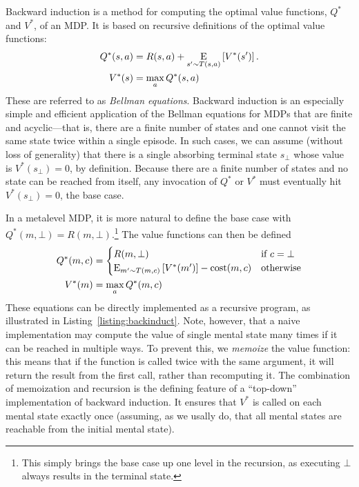 Backward induction is a method for computing the optimal value functions, $Q^*$ and $V^*$, of an MDP. It is based on recursive definitions of the optimal value functions:
\begin{equation}\label{eq:value-recursive}
\begin{aligned}
    Q^*(s, a) &= R(s, a) + \expectunder{V^*(s')}{s' \sim T(s,a)}.\\
    V^*(s) &= \max_a Q^*(s, a)
\end{aligned}
\end{equation}
These are referred to as \emph{Bellman equations}. Backward induction is an especially simple and efficient application of the Bellman equations for MDPs that are finite and acyclic---that is, there are a finite number of states and one cannot visit the same state twice within a single episode. In such cases, we can assume (without loss of generality) that there is a single absorbing terminal state $s_\bot$ whose value is $V^*(s_\bot) = 0$, by definition. Because there are a finite number of states and no state can be reached from itself, any invocation of $Q^*$ or $V^*$ must eventually hit $V^*(s_\bot) = 0$, the base case.

In a metalevel MDP, it is more natural to define the base case with $Q^*(m, \bot) = R(m, \bot)$.\footnote{%
  This simply brings the base case up one level in the recursion, as executing $\bot$ always results in the terminal state.
} The value functions can then be defined
\begin{equation}\label{eq:value-recursive-meta}
\begin{aligned}
    Q^*(m, c) &= \begin{cases}
      R(m, \bot) &\text{if } c = \bot \\
      \expectunder{V^*(m')}{m' \sim T(m,c)} - \cost(m, c) &\text{otherwise}
    \end{cases} \\
    V^*(m) &= \max_a Q^*(m, c)
\end{aligned}
\end{equation}
These equations can be directly implemented as a recursive program, as illustrated in Listing~\ref{listing:backinduct}. Note, however, that a naive implementation may compute the value of single mental state many times if it can be reached in multiple ways. To prevent this, we \emph{memoize} the value function: this means that if the function is called twice with the same argument, it will return the result from the first call, rather than recomputing it. The combination of memoization and recursion is the defining feature of a ``top-down'' implementation of backward induction. It ensures that $V^*$ is called on each mental state exactly once (assuming, as we usally do, that all mental states are reachable from the initial mental state).

